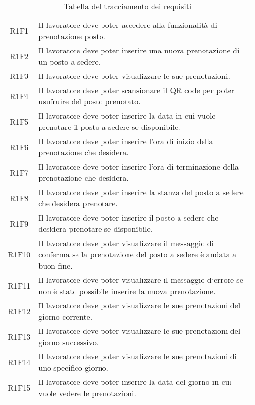 \begin{table}[h]%
	\renewcommand{\arraystretch}{1.4}
	\centering
	\begin{tabularx}{\textwidth}{c X}
		\hline	
		\rowcolor{giallo}
		\intest{Codice} &  \intest{Descrizione} \\	
		\hline			
		R1F1 & Il lavoratore deve poter accedere alla funzionalità di prenotazione posto.\\
		R1F2 & Il lavoratore deve poter inserire una nuova prenotazione di un posto a sedere.\\
		R1F3 & Il lavoratore deve poter visualizzare le sue prenotazioni.\\
		R1F4 & Il lavoratore deve poter scansionare il \gls{QR code}\ap{[g]} per poter usufruire del posto prenotato.\\
		R1F5 & Il lavoratore deve poter inserire la data in cui vuole prenotare il posto a sedere se disponibile.\\
		R1F6 & Il lavoratore deve poter inserire l'ora di inizio della prenotazione che desidera.\\
		R1F7 & Il lavoratore deve poter inserire l'ora di terminazione della prenotazione che desidera.\\
		R1F8 & Il lavoratore deve poter inserire la stanza del posto a sedere che desidera prenotare.\\
		R1F9 & Il lavoratore deve poter inserire il posto a sedere che desidera prenotare se disponibile.\\
		R1F10 & Il lavoratore deve poter visualizzare il messaggio di conferma se la prenotazione del posto a sedere è andata a buon fine.\\
		R1F11 & Il lavoratore deve poter visualizzare il messaggio d'errore se non è stato possibile inserire la nuova prenotazione.\\
		R1F12 & Il lavoratore deve poter visualizzare le sue prenotazioni del giorno corrente.\\
		R1F13 & Il lavoratore deve poter visualizzare le sue prenotazioni del giorno successivo.\\
		R1F14 & Il lavoratore deve poter visualizzare le sue prenotazioni di uno specifico giorno.\\
		R1F15 & Il lavoratore deve poter inserire la data del giorno in cui vuole vedere le prenotazioni.\\
		\hline	
	\end{tabularx} \hbox{}
	\caption{Tabella del tracciamento dei requisiti}
\end{table}%
\\

